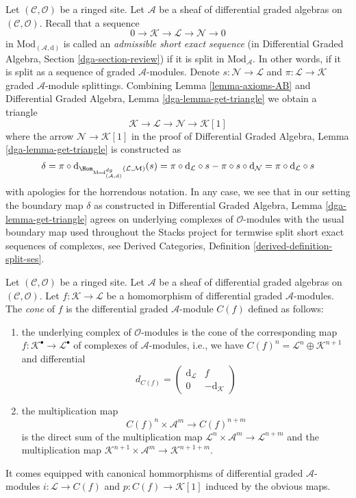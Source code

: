 \medskip\noindent
Let $(\mathcal{C}, \mathcal{O})$ be a ringed site.
Let $\mathcal{A}$ be a sheaf of differential graded algebras
on $(\mathcal{C}, \mathcal{O})$.
Recall that a sequence
$$
0 \to \mathcal{K} \to \mathcal{L} \to \mathcal{N} \to 0
$$
in $\text{Mod}_{(\mathcal{A}, \text{d})}$
is called an {\it admissible short exact sequence}
(in Differential Graded Algebra, Section \ref{dga-section-review})
if it is split in $\text{Mod}_\mathcal{A}$. In other words, if it is split
as a sequence of graded $\mathcal{A}$-modules. Denote
$s : \mathcal{N} \to \mathcal{L}$ and
$\pi : \mathcal{L} \to \mathcal{K}$
graded $\mathcal{A}$-module splittings.
Combining Lemma \ref{lemma-axioms-AB} and 
Differential Graded Algebra, Lemma \ref{dga-lemma-get-triangle}
we obtain a triangle
$$
\mathcal{K} \to \mathcal{L} \to \mathcal{N} \to \mathcal{K}[1]
$$
where the arrow $\mathcal{N} \to \mathcal{K}[1]$ in the proof
of Differential Graded Algebra, Lemma \ref{dga-lemma-get-triangle}
is constructed as
$$
\delta = \pi \circ
\text{d}_{\Hom_{\text{Mod}^{dg}_{(\mathcal{A}, \text{d})}}
(\mathcal{L}, \mathcal{M})}(s) =
\pi \circ \text{d}_\mathcal{L} \circ s -
\pi \circ s \circ \text{d}_\mathcal{N} =
\pi \circ \text{d}_\mathcal{L} \circ s
$$
with apologies for the horrendous notation. In any case, we see that
in our setting the boundary map $\delta$ as constructed in
Differential Graded Algebra, Lemma \ref{dga-lemma-get-triangle}
agrees on underlying complexes of $\mathcal{O}$-modules
with the usual boundary map used throughout the Stacks project
for termwise split short exact sequences of complexes, see
Derived Categories, Definition \ref{derived-definition-split-ses}.

\begin{definition}
\label{definition-cone}
Let $(\mathcal{C}, \mathcal{O})$ be a ringed site.
Let $\mathcal{A}$ be a sheaf of differential graded algebras
on $(\mathcal{C}, \mathcal{O})$.
Let $f : \mathcal{K} \to \mathcal{L}$
be a homomorphism of differential graded $\mathcal{A}$-modules.
The {\it cone} of $f$ is the differential graded $\mathcal{A}$-module
$C(f)$ defined as follows:
\begin{enumerate}
\item the underlying complex of $\mathcal{O}$-modules
is the cone of the corresponding map
$f : \mathcal{K}^\bullet \to \mathcal{L}^\bullet$ of
complexes of $\mathcal{A}$-modules, i.e., we have
$C(f)^n = \mathcal{L}^n \oplus \mathcal{K}^{n + 1}$ and
differential
$$
d_{C(f)} =
\left(
\begin{matrix}
\text{d}_\mathcal{L} & f \\
0 & -\text{d}_\mathcal{K}
\end{matrix}
\right)
$$
\item the multiplication map
$$
C(f)^n \times \mathcal{A}^m \to C(f)^{n + m}
$$
is the direct sum of the multiplication map
$\mathcal{L}^n \times \mathcal{A}^m \to \mathcal{L}^{n + m}$
and the multiplication map
$\mathcal{K}^{n + 1} \times \mathcal{A}^m \to \mathcal{K}^{n + 1 + m}$.
\end{enumerate}
It comes equipped with canonical hommorphisms of differential graded
$\mathcal{A}$-modules $i : \mathcal{L} \to C(f)$
and $p : C(f) \to \mathcal{K}[1]$ induced by the obvious maps.
\end{definition}

